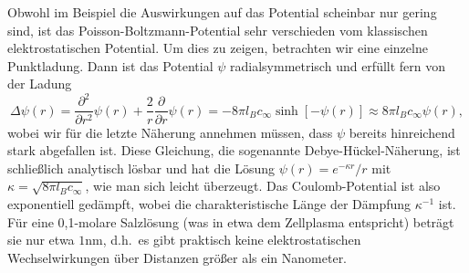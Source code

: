 Obwohl im Beispiel die Auswirkungen auf das Potential scheinbar nur
gering sind, ist das Poisson-Boltzmann-Potential sehr verschieden vom
klassischen elektrostatischen Potential. Um dies zu zeigen, betrachten
wir eine einzelne Punktladung. Dann ist das Potential $\psi$
radialsymmetrisch und erfüllt fern von der Ladung
\begin{equation}
  \Delta \psi(r) =\frac{\partial^2}{\partial r^2} \psi(r)
  +\frac{2}{r}\frac{\partial}{\partial r} \psi(r) =
  -8\pi l_B c_\infty\sinh[-\psi(r)] \approx 8\pi l_B c_\infty\psi(r),
\end{equation}
wobei wir für die letzte Näherung annehmen müssen, dass $\psi$ bereits
hinreichend stark abgefallen ist. Diese Gleichung, die sogenannte
Debye-Hückel-Näherung, ist schließlich analytisch lösbar und hat die
Lösung $\psi(r) = e^{-\kappa r}/r$
mit $\kappa = \sqrt{8\pi l_B c_\infty}$, wie man sich leicht
überzeugt. Das Coulomb-Potential ist also exponentiell gedämpft, wobei
die charakteristische Länge der Dämpfung $\kappa^{-1}$ ist. Für eine
0,1-molare Salzlösung (was in etwa dem Zellplasma entspricht) beträgt
sie nur etwa $1$nm, d.h.\ es gibt praktisch keine elektrostatischen
Wechselwirkungen über Distanzen größer als ein Nanometer.

%

